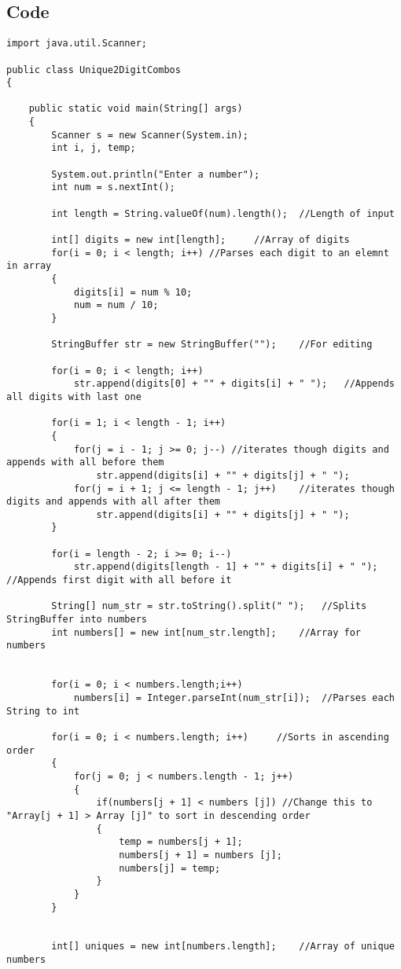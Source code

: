 \documentclass[ProgramminAssignment.tex]{subfiles}
\begin{document}
\subsection{Code}
\begin{lstlisting}
import java.util.Scanner;

public class Unique2DigitCombos
{

	public static void main(String[] args)
	{
		Scanner s = new Scanner(System.in);
		int i, j, temp;

		System.out.println("Enter a number");
		int num = s.nextInt();
		
		int length = String.valueOf(num).length();	//Length of input	
		
		int[] digits = new int[length];		//Array of digits
		for(i = 0; i < length; i++)	//Parses each digit to an elemnt in array
		{
			digits[i] = num % 10;
			num = num / 10;
		}
		
		StringBuffer str = new StringBuffer("");	//For editing
		
		for(i = 0; i < length; i++)
			str.append(digits[0] + "" + digits[i] + " ");	//Appends all digits with last one
		
		for(i = 1; i < length - 1; i++)	
		{
			for(j = i - 1; j >= 0; j--)	//iterates though digits and appends with all before them
				str.append(digits[i] + "" + digits[j] + " ");	
			for(j = i + 1; j <= length - 1; j++)	//iterates though digits and appends with all after them
				str.append(digits[i] + "" + digits[j] + " ");	
		}
		
		for(i = length - 2; i >= 0; i--)
			str.append(digits[length - 1] + "" + digits[i] + " ");	//Appends first digit with all before it
		
		String[] num_str = str.toString().split(" ");	//Splits StringBuffer into numbers
		int numbers[] = new int[num_str.length];	//Array for numbers
		
		
		for(i = 0; i < numbers.length;i++)
			numbers[i] = Integer.parseInt(num_str[i]);	//Parses each String to int
		
		for(i = 0; i < numbers.length; i++)		//Sorts in ascending order
		{
			for(j = 0; j < numbers.length - 1; j++)
			{
				if(numbers[j + 1] < numbers [j]) //Change this to "Array[j + 1] > Array [j]" to sort in descending order
				{
					temp = numbers[j + 1];
					numbers[j + 1] = numbers [j];
					numbers[j] = temp;
				}
			}
		}
		
	
		int[] uniques = new int[numbers.length];	//Array of unique numbers
		

\end{lstlisting}
\end{document}
